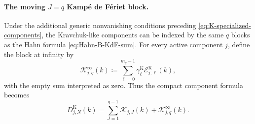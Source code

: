 \documentclass[10pt]{amsart}
\theoremstyle{plain}
\theoremstyle{definition}
\theoremstyle{remark}
\begin{document}
\paragraph{The moving \(J=q\) Kamp\'e de F\'eriet block.}
Under the additional generic nonvanishing conditions preceding
\eqref{eq:K-specialized-components}, the Kravchuk-like components can be
indexed by the same \(q\) blocks as the Hahn formula
\eqref{eq:Hahn-B-KdF-sum}.  For every active component \(j\), define the
block at infinity by
\begin{equation}
 \mathscr K_{j,q}^{\infty}(k)
 \coloneq
 \sum_{\ell=0}^{m_q-1}
 \gamma_\ell^{\mathrm K}\mathcal E_{j,\ell}^{\mathrm K}(k),
 \label{eq:K-moving-block-definition}
\end{equation}
with the empty sum interpreted as zero.  Thus the compact component
formula becomes
\begin{equation}
 D_{j,N}^{\mathrm K}(k)
 =\sum_{J=1}^{q-1}\mathscr K_{j,J}(k)
  +\mathscr K_{j,q}^{\infty}(k).
 \label{eq:K-all-sector-components}
\end{equation}
\end{document}
